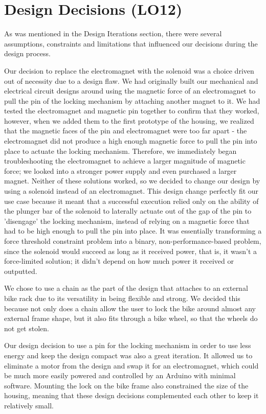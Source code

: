 \documentclass{article}
\begin{document}
\section{Design Decisions (LO12)}

 As was mentioned in the Design Iterations section, there were several assumptions, constraints and limitations that influenced our decisions during the design process. 

Our decision to replace the electromagnet with the solenoid was a choice driven out of necessity due to a design flaw. We had originally built our mechanical and electrical circuit designs around using the magnetic  force of an electromagnet to pull the pin of the locking mechanism by attaching another magnet to it. We had tested the electromagnet and magnetic pin together to confirm that they worked, however, when we added them to the first prototype of the housing, we realized that the magnetic faces of the pin and electromagnet were too far apart - the electromagnet did not produce a high enough magnetic force to pull the pin into place to actuate the locking mechanism. Therefore, we immediately began troubleshooting the electromagnet to achieve a larger magnitude of magnetic force; we looked into a stronger power supply and even purchased a larger magnet. Neither of these solutions worked, so we decided to change our design by using a solenoid instead of an electromagnet. This design change perfectly fit our use case because it meant that a successful execution relied only on the ability of the plunger bar of the solenoid to laterally actuate out of the gap of the pin to 'disengage' the locking mechanism, instead of relying on a magnetic force that had to be high enough to pull the pin into place. It was essentially transforming a force threshold constraint problem into a binary, non-performance-based problem, since the solenoid would succeed as long as it received power, that is, it wasn't a force-limited solution; it didn't depend on how much power it received or outputted. 

We chose to use a chain as the part of the design that attaches to an external bike rack due to its versatility in being flexible and strong. We decided this because not only does a chain allow the user to lock the bike around almost any external frame shape, but it also fits through a bike wheel, so that the  wheels do not get stolen.

Our design decision to use a pin for the locking mechanism in order to use less energy and keep the design compact was also a great iteration. It allowed us to eliminate a motor from the design and swap it for an electromagnet, which could be much more easily powered and controlled by an Arduino with minimal software. Mounting the lock on the bike frame also constrained the size of the housing, meaning that these design decisions complemented each other to keep it relatively small. 
\end{document}
